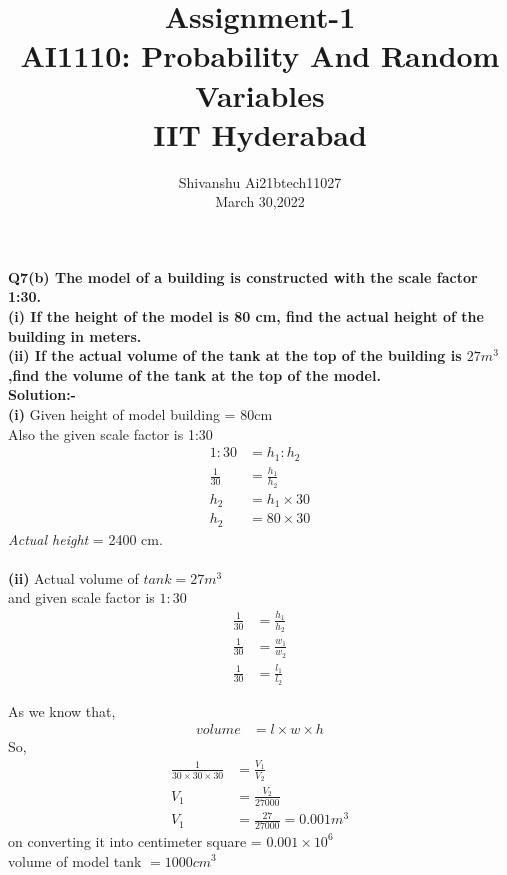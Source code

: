 \documentclass[12pt]{IEEEtran}
\title{\textbf{Assignment-1}\\ \large AI1110: Probability And Random Variables\\ IIT Hyderabad}
\author{Shivanshu  Ai21btech11027\\ March 30,2022}
\begin{document}
 \maketitle
 \textbf{Q7(b)\hspace{1mm} The model of a building is constructed with the scale factor 1:30.}\\
 
 \textbf{(i) If the height of the model is 80 cm, find the actual height of the building in meters.}\\
 
 \textbf{(ii) If the actual volume of the tank at the top of the building is $ 27m^3 $,find the volume of the tank at the top of the model.}\\
 
 \textbf{Solution:-}\\
 \textbf{(i)}
 Given height of model building = 80cm\\
 Also the given scale factor is 1:30\\
 \begin{align}
  1 : 30 &= h_{1} : h_{2}\\
  \frac{1}{30} &= \frac{h_{1}}{h_{2}}\\
  h_{2} &= h_{1}\times 30\\
  h_{2} &= 80 \times 30
 \end{align}
 \textit{Actual height} = 2400 cm.\\
 \\ 
 \textbf{(ii)}
 Actual volume of $tank = 27m^3 $\\
 and given  scale factor is $ 1:30 $\\

 \begin{align}
  \frac{1}{30} &= \frac{h_{1}}{h_{2}}\\
  \frac{1}{30} &= \frac{w_{1}}{w_{2}}\\
  \frac{1}{30} &= \frac{l_{1}}{l_{2}}
 \end{align}

 As we know that,
 \begin{align}
  volume &= l\times w\times h
 \end{align}
 So,
 \begin{align}
  \frac{1}{30\times30\times30} &= \frac{V_{1}}{V_{2}} \\
  V_{1} &= \frac{V_{2}}{27000} \\
  V_{1} &= \frac{27}{27000} = 0.001m^3
 \end{align}
 on converting it into centimeter square = $0.001 \times 10^6$\\
 volume of model tank $= 1000 cm^3$\\
\end{document}
